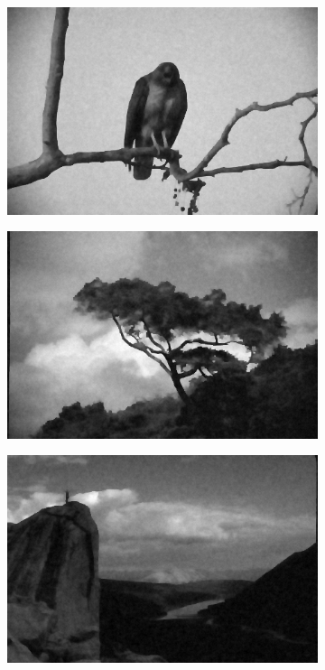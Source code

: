 \documentclass[onecolumn,final,a4paper,13pt,reqno]{siamart}
\begin{document}
\begin{figure}[h]
\begin{subfigure}[t]{0.19\textwidth}
	\end{subfigure}
	\begin{subfigure}[t]{0.19\textwidth}
		\includegraphics[scale=0.175]{pictures/denoising/image/42049_ipiano_absolute.png}
	\end{subfigure}
	\begin{subfigure}[t]{0.19\textwidth}
		\includegraphics[scale=0.175]{pictures/denoising/image/147091_ipiano_absolute.png}
	\end{subfigure}
	\begin{subfigure}[t]{0.19\textwidth}
		\includegraphics[scale=0.175]{pictures/denoising/image/14037_ipiano_absolute.png}

\end{subfigure}
\end{figure}
\end{document}
